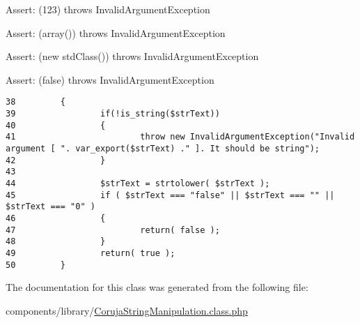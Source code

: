 \begin{Desc}
\item[Assert:](123) throws InvalidArgumentException \end{Desc}
\begin{Desc}
\item[Assert:](array()) throws InvalidArgumentException \end{Desc}
\begin{Desc}
\item[Assert:](new stdClass()) throws InvalidArgumentException \end{Desc}
\begin{Desc}
\item[Assert:](false) throws InvalidArgumentException \end{Desc}


\begin{Code}\begin{verbatim}38         {
39                 if(!is_string($strText))
40                 {
41                         throw new InvalidArgumentException("Invalid argument [ ". var_export($strText) ." ]. It should be string");
42                 }
43 
44                 $strText = strtolower( $strText );
45                 if ( $strText === "false" || $strText === "" || $strText === "0" )
46                 {
47                         return( false );
48                 }
49                 return( true );
50         }
\end{verbatim}
\end{Code}




The documentation for this class was generated from the following file:\begin{CompactItemize}
\item 
components/library/\hyperlink{_coruja_string_manipulation_8class_8php}{CorujaStringManipulation.class.php}\end{CompactItemize}
